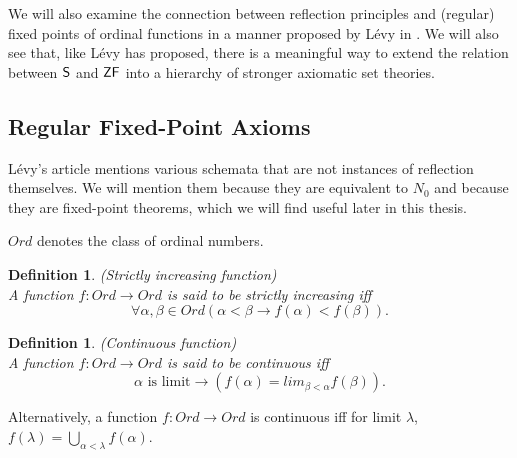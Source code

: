\documentclass[12pt,a4paper]{article}
\newtheorem{definition}[theorem]{Definition}
\newcommand{\then}{\rightarrow}
\begin{document}
We will also examine the connection between reflection principles and (regular) fixed points of ordinal functions in a manner proposed by Lévy in \cite{Levy60a}. We will also see that, like Lévy \cite{Levy60a} has proposed, there is a meaningful way to extend the relation between $\sf{S}$ and $\sf{ZF}$ into a hierarchy of stronger axiomatic set theories. 


\subsection{Regular Fixed-Point Axioms}

Lévy's article mentions various schemata that are not instances of reflection themselves. We will mention them because they are equivalent to $N_0$ and because they are fixed-point theorems, which we will find useful later in this thesis.

$Ord$ denotes the class of ordinal numbers.
\begin{definition}{(Strictly increasing function)}\label{def:increasing_function}\\
A function $f: Ord \then Ord$ is said to be \emph{strictly increasing} iff
\begin{equation}
\forall \alpha, \beta \in Ord (\alpha < \beta \then f(\alpha) < f(\beta)).
\end{equation}
\end{definition}

\begin{definition}{(Continuous function)}\label{def:continuous_function}\\
A function $f: Ord \then Ord$ is said to be \emph{continuous} iff
\begin{equation}
\alpha\mbox{ is limit} \then (f(\alpha) = lim_{\beta < \alpha} f(\beta)).
\end{equation}
\end{definition}
Alternatively, a function $f: Ord \then Ord$ is continuous iff for limit $\lambda$, $f(\lambda) = \bigcup_{\alpha < \lambda} f(\alpha)$.
\end{document}
